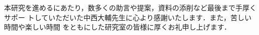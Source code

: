 \newpage
{}
本研究を進めるにあたり，数多くの助言や提案，資料の添削など最後まで手厚くサポー
トしていただいた中西大輔先生に心より感謝いたします．また，苦しい時間や楽しい時間
をともにした研究室の皆様に厚くお礼申し上げます．